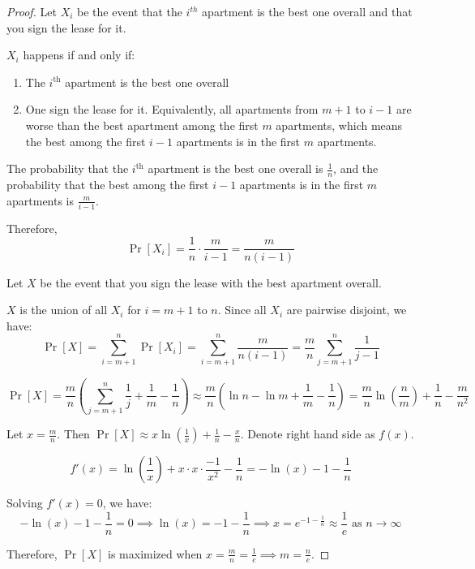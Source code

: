 \begin{proof}
  Let $X_i$ be the event that the $i^{th}$ apartment is the best one overall and that you sign the lease for it.

       $X_i$ happens if and only if:
       \begin{enumerate}
         \item The $i^{\text{th}}$ apartment is the best one overall
         \item One sign the lease for it. Equivalently, all apartments from $m+1$ to $i-1$ are worse than the best apartment among the first $m$ apartments, which means the best among the first $i-1$ apartments is in the first $m$ apartments.
       \end{enumerate}

       The probability that the $i^{\text{th}}$ apartment is the best one overall is $\frac{1}{n}$, and the probability that the best among the first $i-1$ apartments is in the first $m$ apartments is $\frac{m}{i-1}$.

       Therefore, \[
         \Pr[X_i] = \frac{1}{n} \cdot \frac{m}{i-1} = \frac{m}{n(i-1)}
       \]

 Let $X$ be the event that you sign the lease with the best apartment overall.

       $X$ is the union of all $X_i$ for $i=m+1$ to $n$. Since all $X_i$ are pairwise disjoint, we have:
       \[
         \Pr[X] = \sum_{i=m+1}^{n} \Pr[X_i] = \sum_{i=m+1}^{n} \frac{m}{n(i-1)} = \frac{m}{n} \sum_{j=m+1}^{n} \frac{1}{j-1}
       \]

       \[
         \Pr[X] = \frac{m}{n} (\sum_{j=m+1}^{n} \frac{1}{j} + \frac{1}{m} - \frac{1}{n}) \approx \frac{m}{n} (\ln n - \ln m + \frac{1}{m} - \frac{1}{n}) = \frac{m}{n} \ln(\frac{n}{m}) + \frac{1}{n} - \frac{m}{n^2}
       \]

       Let $x = \frac{m}{n}$. Then $\Pr[X] \approx x \ln(\frac{1}{x}) + \frac{1}{n} - \frac{x}{n}$. Denote right hand side as $f(x)$.

       \[
         f'(x) = \ln(\frac{1}{x}) + x \cdot x \cdot \frac{-1}{x^2} - \frac{1}{n} = -\ln(x) - 1 - \frac{1}{n}
       \]

       Solving $f'(x) = 0$, we have:
       \[
         -\ln(x) - 1 - \frac{1}{n} = 0 \implies \ln(x) = -1 - \frac{1}{n} \implies x = e^{-1 - \frac{1}{n}} \approx \frac{1}{e} \text{ as } n \rightarrow \infty
       \]

       Therefore, $\Pr[X]$ is maximized when $x = \frac{m}{n} = \frac{1}{e} \implies m = \frac{n}{e}$.
\end{proof}

